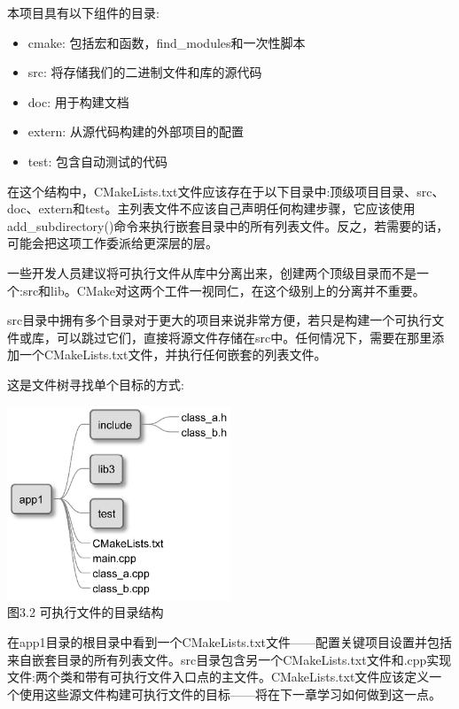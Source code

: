 本项目具有以下组件的目录:

\begin{itemize}
\item 
cmake: 包括宏和函数，find\_modules和一次性脚本

\item 
src: 将存储我们的二进制文件和库的源代码

\item 
doc: 用于构建文档

\item 
extern: 从源代码构建的外部项目的配置

\item 
test: 包含自动测试的代码
\end{itemize}

在这个结构中，CMakeLists.txt文件应该存在于以下目录中:顶级项目目录、src、doc、extern和test。主列表文件不应该自己声明任何构建步骤，它应该使用add\_subdirectory()命令来执行嵌套目录中的所有列表文件。反之，若需要的话，可能会把这项工作委派给更深层的层。

\begin{tcolorbox}[colback=blue!5!white,colframe=blue!75!black,title=Note]
一些开发人员建议将可执行文件从库中分离出来，创建两个顶级目录而不是一个:src和lib。CMake对这两个工件一视同仁，在这个级别上的分离并不重要。
\end{tcolorbox}

src目录中拥有多个目录对于更大的项目来说非常方便，若只是构建一个可执行文件或库，可以跳过它们，直接将源文件存储在src中。任何情况下，需要在那里添加一个CMakeLists.txt文件，并执行任何嵌套的列表文件。

这是文件树寻找单个目标的方式:

\begin{center}
\includegraphics[width=0.5\textwidth]{content/1/chapter3/images/2.jpg}\\
图3.2 可执行文件的目录结构
\end{center}

在app1目录的根目录中看到一个CMakeLists.txt文件——配置关键项目设置并包括来自嵌套目录的所有列表文件。src目录包含另一个CMakeLists.txt文件和.cpp实现文件:两个类和带有可执行文件入口点的主文件。CMakeLists.txt文件应该定义一个使用这些源文件构建可执行文件的目标——将在下一章学习如何做到这一点。

